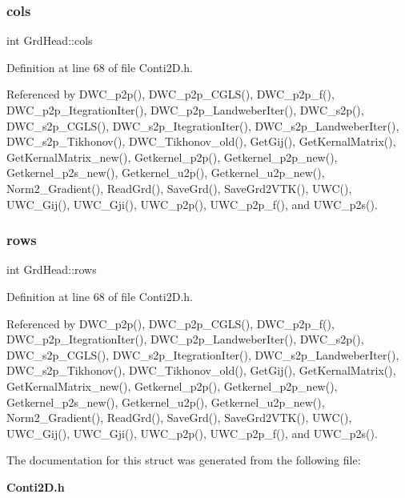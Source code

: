 \mbox{\label{structGrdHead_ad21552200c2254355c545cd0e79c9a8b_ad21552200c2254355c545cd0e79c9a8b}} 
\subsubsection{cols}
{\footnotesize\ttfamily int Grd\+Head\+::cols}



Definition at line 68 of file Conti2\+D.\+h.



Referenced by D\+W\+C\+\_\+p2p(), D\+W\+C\+\_\+p2p\+\_\+\+C\+G\+L\+S(), D\+W\+C\+\_\+p2p\+\_\+f(), D\+W\+C\+\_\+p2p\+\_\+\+Itegration\+Iter(), D\+W\+C\+\_\+p2p\+\_\+\+Landweber\+Iter(), D\+W\+C\+\_\+s2p(), D\+W\+C\+\_\+s2p\+\_\+\+C\+G\+L\+S(), D\+W\+C\+\_\+s2p\+\_\+\+Itegration\+Iter(), D\+W\+C\+\_\+s2p\+\_\+\+Landweber\+Iter(), D\+W\+C\+\_\+s2p\+\_\+\+Tikhonov(), D\+W\+C\+\_\+\+Tikhonov\+\_\+old(), Get\+Gij(), Get\+Kernal\+Matrix(), Get\+Kernal\+Matrix\+\_\+new(), Getkernel\+\_\+p2p(), Getkernel\+\_\+p2p\+\_\+new(), Getkernel\+\_\+p2s\+\_\+new(), Getkernel\+\_\+u2p(), Getkernel\+\_\+u2p\+\_\+new(), Norm2\+\_\+\+Gradient(), Read\+Grd(), Save\+Grd(), Save\+Grd2\+V\+T\+K(), U\+W\+C(), U\+W\+C\+\_\+\+Gij(), U\+W\+C\+\_\+\+Gji(), U\+W\+C\+\_\+p2p(), U\+W\+C\+\_\+p2p\+\_\+f(), and U\+W\+C\+\_\+p2s().

\mbox{\label{structGrdHead_a268486005ed0ab72a1f1a82231d3cdf9_a268486005ed0ab72a1f1a82231d3cdf9}} 
\subsubsection{rows}
{\footnotesize\ttfamily int Grd\+Head\+::rows}



Definition at line 68 of file Conti2\+D.\+h.



Referenced by D\+W\+C\+\_\+p2p(), D\+W\+C\+\_\+p2p\+\_\+\+C\+G\+L\+S(), D\+W\+C\+\_\+p2p\+\_\+f(), D\+W\+C\+\_\+p2p\+\_\+\+Itegration\+Iter(), D\+W\+C\+\_\+p2p\+\_\+\+Landweber\+Iter(), D\+W\+C\+\_\+s2p(), D\+W\+C\+\_\+s2p\+\_\+\+C\+G\+L\+S(), D\+W\+C\+\_\+s2p\+\_\+\+Itegration\+Iter(), D\+W\+C\+\_\+s2p\+\_\+\+Landweber\+Iter(), D\+W\+C\+\_\+s2p\+\_\+\+Tikhonov(), D\+W\+C\+\_\+\+Tikhonov\+\_\+old(), Get\+Gij(), Get\+Kernal\+Matrix(), Get\+Kernal\+Matrix\+\_\+new(), Getkernel\+\_\+p2p(), Getkernel\+\_\+p2p\+\_\+new(), Getkernel\+\_\+p2s\+\_\+new(), Getkernel\+\_\+u2p(), Getkernel\+\_\+u2p\+\_\+new(), Norm2\+\_\+\+Gradient(), Read\+Grd(), Save\+Grd(), Save\+Grd2\+V\+T\+K(), U\+W\+C(), U\+W\+C\+\_\+\+Gij(), U\+W\+C\+\_\+\+Gji(), U\+W\+C\+\_\+p2p(), U\+W\+C\+\_\+p2p\+\_\+f(), and U\+W\+C\+\_\+p2s().



The documentation for this struct was generated from the following file\+:\begin{DoxyCompactItemize}
\item 
\textbf{ Conti2\+D.\+h}\end{DoxyCompactItemize}
